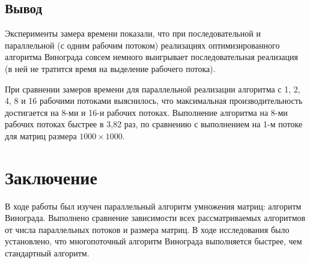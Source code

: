 \documentclass[12pt]{report}
\begin{document}
        

\section{Вывод}

Эксперименты замера времени показали, что при последовательной и параллельной (с одним рабочим потоком) реализациях оптимизированного алгоритма Винограда совсем немного выигрывает последовательная реализация (в ней не тратится время на выделение рабочего потока).
       
        При сравнении замеров времени для параллельной реализации алгоритма с 1, 2, 4, 8 и 16 рабочими потоками выяснилось, что максимальная производительность достигается на 8-ми и 16-и рабочих потоках. Выполнение алгоритма на 8-ми рабочих потоках быстрее в 3,82 раз, по сравнению с выполнением на 1-м потоке для матриц размера $1000 \times 1000$.


\chapter*{Заключение}
В ходе работы был изучен параллельный алгоритм умножения матриц: алгоритм Винограда. Выполнено сравнение зависимости всех рассматриваемых алгоритмов от числа параллельных потоков и размера матриц. В ходе исследования было установлено, что многопоточный алгоритм Винограда выполняется быстрее, чем стандартный алгоритм.
\end{document}
